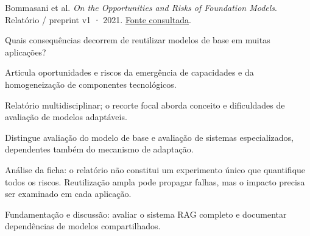 {\small Bommasani et al. \textit{On the Opportunities and Risks of Foundation Models}. Relatório / preprint v1 · 2021. \href{https://arxiv.org/pdf/2108.07258v1}{Fonte consultada}.\par}

Quais consequências decorrem de reutilizar modelos de base em muitas aplicações?

Articula oportunidades e riscos da emergência de capacidades e da homogeneização de componentes tecnológicos.

Relatório multidisciplinar; o recorte focal aborda conceito e dificuldades de avaliação de modelos adaptáveis.

Distingue avaliação do modelo de base e avaliação de sistemas especializados, dependentes também do mecanismo de adaptação.

\begin{itemize}
\end{itemize}

Análise da ficha: o relatório não constitui um experimento único que quantifique todos os riscos. Reutilização ampla pode propagar falhas, mas o impacto precisa ser examinado em cada aplicação.

Fundamentação e discussão: avaliar o sistema RAG completo e documentar dependências de modelos compartilhados.


